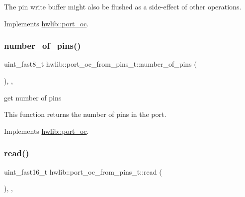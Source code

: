 The pin write buffer might also be flushed as a side-\/effect of other operations. 

Implements \hyperlink{classhwlib_1_1port__oc_a49b64bd24431b35e92e208df84327dae}{hwlib\+::port\+\_\+oc}.

\mbox{\label{classhwlib_1_1port__oc__from__pins__t_ae366a1c7b3790e5f0c78c8be813050d8}} 
\subsubsection{\texorpdfstring{number\+\_\+of\+\_\+pins()}{number\_of\_pins()}}
{\footnotesize\ttfamily uint\+\_\+fast8\+\_\+t hwlib\+::port\+\_\+oc\+\_\+from\+\_\+pins\+\_\+t\+::number\+\_\+of\+\_\+pins (\begin{DoxyParamCaption}{ }\end{DoxyParamCaption})\hspace{0.3cm}{\ttfamily [inline]}, {\ttfamily [override]}, {\ttfamily [virtual]}}





get number of pins

This function returns the number of pins in the port. 

Implements \hyperlink{classhwlib_1_1port__oc_a44d0dbfde290ad17237ad70c09a4c402}{hwlib\+::port\+\_\+oc}.

\mbox{\label{classhwlib_1_1port__oc__from__pins__t_a9bd46a2c70ab338350e899b757e6422c}} 
\subsubsection{\texorpdfstring{read()}{read()}}
{\footnotesize\ttfamily uint\+\_\+fast16\+\_\+t hwlib\+::port\+\_\+oc\+\_\+from\+\_\+pins\+\_\+t\+::read (\begin{DoxyParamCaption}{ }\end{DoxyParamCaption})\hspace{0.3cm}{\ttfamily [inline]}, {\ttfamily [override]}, {\ttfamily [virtual]}}





